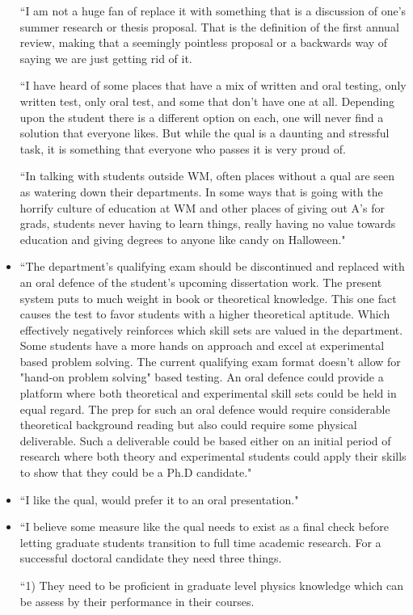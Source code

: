 \documentclass[oneside]{book}   %
\begin{document}
\begin{itemize}
``I am not a huge fan of replace it with something that is a discussion of one's summer research or thesis proposal. That is the definition of the first annual review, making that a seemingly pointless proposal or a backwards way of saying we are just getting rid of it.

``I have heard of some places that have a mix of written and oral testing, only written test, only oral test, and some that don't have one at all. Depending upon the student there is a different option on each, one will never find a solution that everyone likes. But while the qual is a daunting and stressful task, it is something that everyone who passes it is very proud of.

``In talking with students outside WM, often places without a qual are seen as watering down their departments. In some ways that is going with the horrify culture of education at WM and other places of giving out A's for grads, students never having to learn things, really having no value towards education and giving degrees to anyone like candy on Halloween."
	\item ``The department's qualifying exam should be discontinued and replaced with an oral defence of the student's upcoming dissertation work. The present system puts to much weight in book or theoretical knowledge. This one fact causes the test to favor students with a higher theoretical aptitude. Which effectively negatively reinforces which skill sets are valued in the department. Some students have a more hands on approach and excel at experimental based problem solving. The current qualifying exam format doesn't allow for "hand-on problem solving" based testing. An oral defence could provide a platform where both theoretical and experimental skill sets could be held in equal regard. The prep for such an oral defence would require considerable theoretical background reading but also could require some physical deliverable. Such a deliverable could be based either on an initial period of research where both theory and experimental students could apply their skills to show that they could be a Ph.D candidate." 
	\item ``I like the qual, would prefer it to an oral presentation."
	\item ``I believe some measure like the qual needs to exist as a final check before letting graduate students transition to full time academic research. For a successful doctoral candidate they need three things.

``1) They need to be proficient in graduate level physics knowledge which can be assess by their performance in their courses.


\end{itemize}
\end{document}
